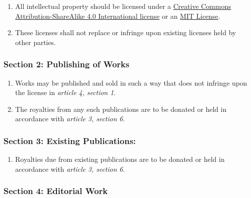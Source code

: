 \begin{enumerate}
\def\labelenumi{\arabic{enumi}.}
\tightlist
\item
  All intellectual property should be licensed under a \href{https://creativecommons.org/licenses/by-sa/4.0/}{Creative Commons Attribution-ShareAlike 4.0 International license} or an \href{https://opensource.org/licenses/MIT}{MIT License}.
\item
  These licenses shall not replace or infringe upon existing licenses held by other parties.
\end{enumerate}

\subsubsection*{Section 2: Publishing of Works}\label{section-2-publishing-of-works}

\begin{enumerate}
\def\labelenumi{\arabic{enumi}.}
\tightlist
\item
  Works may be published and sold in such a way that does not infringe upon the license in \emph{article 4, section 1}.
\item
  The royalties from any such publications are to be donated or held in accordance with \emph{article 3, section 6}.
\end{enumerate}

\subsubsection*{Section 3: Existing Publications:}\label{section-3-existing-publications}

\begin{enumerate}
\def\labelenumi{\arabic{enumi}.}
\tightlist
\item
  Royalties due from existing publications are to be donated or held in accordance with \emph{article 3, section 6}.
\end{enumerate}

\subsubsection*{Section 4: Editorial Work}\label{section-4-editorial-work}

